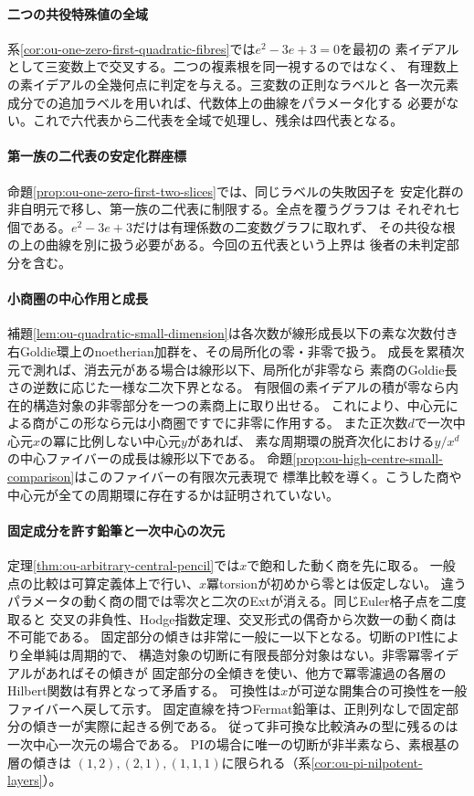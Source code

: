 \documentclass[11pt,a4paper]{ltjsarticle}
\begin{document}
\paragraph{二つの共役特殊値の全域}
系\ref{cor:ou-one-zero-first-quadratic-fibres}では$e^2-3e+3=0$を最初の
素イデアルとして三変数上で交叉する。二つの複素根を同一視するのではなく、
有理数上の素イデアルの全幾何点に判定を与える。三変数の正則なラベルと
各一次元素成分での追加ラベルを用いれば、代数体上の曲線をパラメータ化する
必要がない。これで六代表から二代表を全域で処理し、残余は四代表となる。

\paragraph{第一族の二代表の安定化群座標}
命題\ref{prop:ou-one-zero-first-two-slices}では、同じラベルの失敗因子を
安定化群の非自明元で移し、第一族の二代表に制限する。全点を覆うグラフは
それぞれ七個である。$e^2-3e+3$だけは有理係数の二変数グラフに取れず、
その共役な根の上の曲線を別に扱う必要がある。今回の五代表という上界は
後者の未判定部分を含む。

\paragraph{小商圏の中心作用と成長}
補題\ref{lem:ou-quadratic-small-dimension}は各次数が線形成長以下の素な次数付き
右Goldie環上のnoetherian加群を、その局所化の零・非零で扱う。
成長を累積次元で測れば、消去元がある場合は線形以下、局所化が非零なら
素商のGoldie長さの逆数に応じた一様な二次下界となる。
有限個の素イデアルの積が零なら内在的構造対象の非零部分を一つの素商上に取り出せる。
これにより、中心元による商がこの形なら元は小商圏ですでに非零に作用する。
また正次数$d$で一次中心元$x$の冪に比例しない中心元$y$があれば、
素な周期環の脱斉次化における$y/x^d$の中心ファイバーの成長は線形以下である。
命題\ref{prop:ou-high-centre-small-comparison}はこのファイバーの有限次元表現で
標準比較を導く。こうした商や中心元が全ての周期環に存在するかは証明されていない。

\paragraph{固定成分を許す鉛筆と一次中心の次元}
定理\ref{thm:ou-arbitrary-central-pencil}では$x$で飽和した動く商を先に取る。
一般点の比較は可算定義体上で行い、$x$冪torsionが初めから零とは仮定しない。
違うパラメータの動く商の間では零次と二次のExtが消える。同じEuler格子点を二度取ると
交叉の非負性、Hodge指数定理、交叉形式の偶奇から次数一の動く商は不可能である。
固定部分の傾きは非常に一般に一以下となる。切断のPI性により全単純は周期的で、
構造対象の切断に有限長部分対象はない。非零冪零イデアルがあればその傾きが
固定部分の全傾きを使い、他方で冪零濾過の各層のHilbert関数は有界となって矛盾する。
可換性は$x$が可逆な開集合の可換性を一般ファイバーへ戻して示す。
固定直線を持つFermat鉛筆は、正則列なしで固定部分の傾き一が実際に起きる例である。
従って非可換な比較済みの型に残るのは一次中心一次元の場合である。
PIの場合に唯一の切断が非半素なら、素根基の層の傾きは
$(1,2),(2,1),(1,1,1)$に限られる（系\ref{cor:ou-pi-nilpotent-layers}）。
\end{document}
